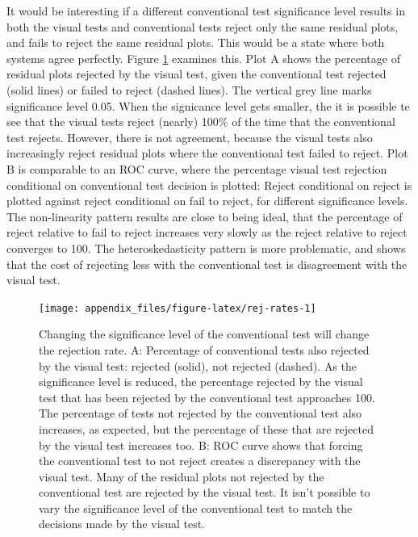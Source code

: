 \documentclass[]{interact}
\theoremstyle{plain}%
\theoremstyle{definition}
\theoremstyle{remark}
\begin{document}
It would be interesting if a different conventional test significance
level results in both the visual tests and conventional tests reject
only the same residual plots, and fails to reject the same residual
plots. This would be a state where both systems agree perfectly. Figure
\ref{fig:rej-rates} examines this. Plot A shows the percentage of
residual plots rejected by the visual test, given the conventional test
rejected (solid lines) or failed to reject (dashed lines). The vertical
grey line marks significance level 0.05. When the signicance level gets
smaller, the it is possible te see that the visual tests reject (nearly)
100\% of the time that the conventional test rejects. However, there is
not agreement, because the visual tests also increasingly reject
residual plots where the conventional test failed to reject. Plot B is
comparable to an ROC curve, where the percentage visual test rejection
conditional on conventional test decision is plotted: Reject conditional
on reject is plotted against reject conditional on fail to reject, for
different significance levels. The non-linearity pattern results are
close to being ideal, that the percentage of reject relative to fail to
reject increases very slowly as the reject relative to reject converges
to 100. The heteroskedasticity pattern is more problematic, and shows
that the cost of rejecting less with the conventional test is
disagreement with the visual test.

\begin{figure}[t!]

{\centering \texttt{[image: appendix\_files/figure-latex/rej-rates-1]} 

}

\caption{Changing the significance level of the conventional test will change the rejection rate. A: Percentage of conventional tests also rejected by the visual test: rejected (solid), not rejected (dashed). As the significance level is reduced, the percentage rejected by the visual test that has been rejected by the conventional test approaches 100. The percentage of tests not rejected by the conventional test also increases, as expected, but the percentage of these that are rejected by the visual test increases too. B: ROC curve shows that forcing the conventional test to not reject creates a discrepancy with the visual test. Many of the residual plots not rejected by the conventional test are rejected by the visual test. It isn't possible to vary the significance level of the conventional test to match the decisions made by the visual test.}\label{fig:rej-rates}
\end{figure}
\end{document}
